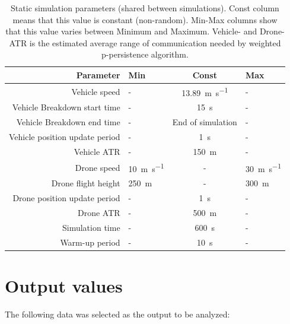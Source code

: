 \documentclass[]{nsm-thesis}
\begin{document}
\begin{table}
    \centering
    \begin{tabular}{rlcl}
        \toprule
        Parameter & Min & Const & Max \\
        \midrule
		Vehicle speed & - & \SI{13.89}{\meter\per\second} & - \\
		Vehicle Breakdown start time & - & \SI{15}{\second} & - \\
		Vehicle Breakdown end time & - & End of simulation & - \\
		Vehicle position update period & - & \SI{1}{\second} & - \\
		Vehicle \ac{ATR} & - & \SI{150}{\meter} & - \\

        	Drone speed & \SI{10}{\meter\per\second} & - & \SI{30}{\meter\per\second} \\
        	Drone flight height & \SI{250}{\meter} & - & \SI{300}{\meter} \\
		Drone position update period & - & \SI{1}{\second} & - \\
		Drone \ac{ATR} & - & \SI{500}{\meter} & - \\

		Simulation time & - & \SI{600}{\second} & - \\
		Warm-up period & - & \SI{10}{\second} & - \\
		
        \bottomrule
    \end{tabular}
    \caption{Static simulation parameters (shared between simulations). Const column means that this value is constant (non-random). Min-Max columns show that this value varies between Minimum and Maximum. Vehicle- and Drone- \ac{ATR} is the estimated average range of communication needed by weighted p-persistence algorithm.}
    \label{tab:simulationparams}
\end{table}

\section{Output values}

The following data was selected as the output to be analyzed:
\end{document}
